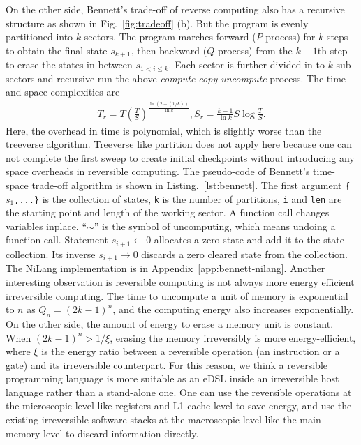 \documentclass{article}
\newcommand{\<}{\langle}
\renewcommand{\>}{\rangle}
\newcommand{\Fig}[1]{Fig.~\ref{#1}}
\newcommand{\Lst}[1]{Listing.~\ref{#1}}
\newcommand{\App}[1]{Appendix~\ref{#1}}
\theoremstyle{definition}\newtheorem{definition}{\textit{Definition}}
\begin{document}
On the other side, Bennett's trade-off of reverse computing also has a recursive structure as shown in \Fig{fig:tradeoff} (b). But the program is evenly partitioned into $k$ sectors. The program marches forward ($P$ process) for $k$ steps to obtain the final state $s_{k+1}$, then backward ($Q$ process) from the $k-1$th step to erase the states in between $s_{1<i\leq k}$. Each sector is further divided in to $k$ sub-sectors and recursive run the above \textit{compute-copy-uncompute} process. The time and space complexities are
\begin{align}\label{eq:rev}
    T_r = T\left(\frac{T}{S}\right)^{\frac{\ln(2-(1/k))}{\ln k}}, S_r = \frac{k-1}{\ln k}S\log\frac{T}{S}.
\end{align}
Here, the overhead in time is polynomial, which is slightly worse than the treeverse algorithm. Treeverse like partition does not apply here because one can not complete the first sweep to create initial checkpoints without introducing any space overheads in reversible computing. The pseudo-code of Bennett's time-space trade-off algorithm is shown in \Lst{lst:bennett}.
The first argument \texttt{\{$s_1$,...\}} is the collection of states, \texttt{k} is the number of partitions, \texttt{i} and \texttt{len} are the starting point and length of the working sector. A function call changes variables inplace. ``$\sim$'' is the symbol of uncomputing, which means undoing a function call.
    Statement \texttt{$s_{i+1} \leftarrow 0$} allocates a zero state and add it to the state collection. Its inverse \texttt{$s_{i+1} \rightarrow 0$} discards a zero cleared state from the collection. The NiLang implementation is in \App{app:bennett-nilang}.
    Another interesting observation is reversible computing is not always more energy efficient irreversible computing. The time to uncompute a unit of memory is exponential to $n$ as $Q_n = (2k-1)^n$, and the computing energy also increases exponentially. On the other side, the amount of energy to erase a memory unit is constant.
    When $(2k-1)^{n} > 1/\xi$, erasing the memory irreversibly is more energy-efficient, where $\xi$ is the energy ratio between a reversible operation (an instruction or a gate) and its irreversible counterpart.
For this reason, we think a reversible programming language is more suitable as an eDSL inside an irreversible host language rather than a stand-alone one.
One can use the reversible operations at the microscopic level like registers and L1 cache level to save energy, and use the existing irreversible software stacks at the macroscopic level like the main memory level to discard information directly.
\end{document}
